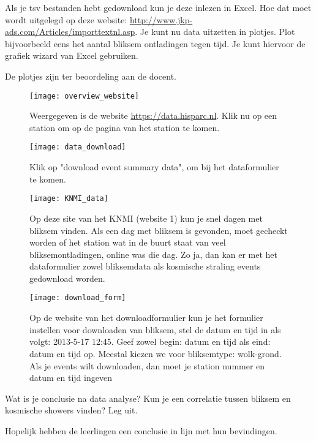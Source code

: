 \begin{questions}
\question
Als je tsv bestanden hebt gedownload kun je deze inlezen in Excel. Hoe dat moet
wordt uitgelegd op deze website: \url{http://www.jkp-ads.com/Articles/importtextnl.asp}.
Je kunt nu data uitzetten in plotjes.
Plot bijvoorbeeld eens het aantal bliksem ontladingen tegen tijd.
Je kunt hiervoor de grafiek wizard van Excel gebruiken.
\begin{solution}
    De plotjes zijn ter beoordeling aan de docent.
\end{solution}

\begin{figure}
    \centering
    \texttt{[image: overview\_website]}
    \caption{Weergegeven is de website \protect\url{https://data.hisparc.nl}.
    Klik nu op een station om op de pagina van
    het station te komen.}
    \label{fig:overview_website}
\end{figure}

\begin{figure}
    \centering
    \texttt{[image: data\_download]}
    \caption{Klik op "download event summary data", om bij het dataformulier te komen.}
    \label{fig:data_download}
\end{figure}

\begin{figure}
    \centering
    \texttt{[image: KNMI\_data]}
    \caption{Op deze site van het KNMI (website 1) kun je snel dagen met bliksem vinden. Als een dag
    met bliksem is gevonden, moet gecheckt worden of het \hisparc station wat in de
    buurt staat van veel bliksemontladingen, online was die dag. Zo ja, dan kan
    er met het dataformulier zowel bliksemdata als kosmische straling events
    gedownload worden.}
    \label{fig:KNMI_data}
\end{figure}

\begin{figure}
    \centering
    \texttt{[image: download\_form]}
    \caption{Op de website van het downloadformulier kun je het formulier
    instellen voor downloaden van bliksem, stel de datum en tijd in als volgt:
    2013-5-17 12:45. Geef zowel begin: datum en tijd als eind: datum en tijd op. Meestal
    kiezen we voor bliksemtype: wolk-grond. Als je events wilt downloaden, dan
    moet je station nummer en datum en tijd ingeven }
    \label{fig:download_form}
\end{figure}


\question
Wat is je conclusie na data analyse? Kun je een correlatie tussen bliksem en
kosmische showers vinden? Leg uit.
\begin{solution}
    Hopelijk hebben de leerlingen een conclusie in lijn met hun bevindingen.
\end{solution}

\end{questions}

